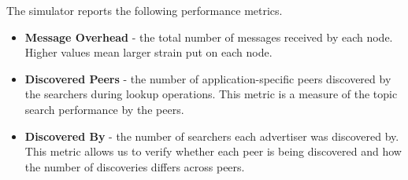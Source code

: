  The simulator reports the following performance metrics. 
 \begin{itemize}
     \item \textbf{Message Overhead} - the total number of messages received by each node. 
Higher values mean larger strain put on each node. 
     \item \textbf{Discovered Peers} - the number of application-specific peers discovered by the searchers during lookup operations. This metric is a measure of the topic search performance by the peers.
     \item \textbf{Discovered By} - the number of searchers each advertiser was discovered by. This metric allows us to verify whether each peer is being discovered and how the number of discoveries differs across peers.
 \end{itemize}
 
